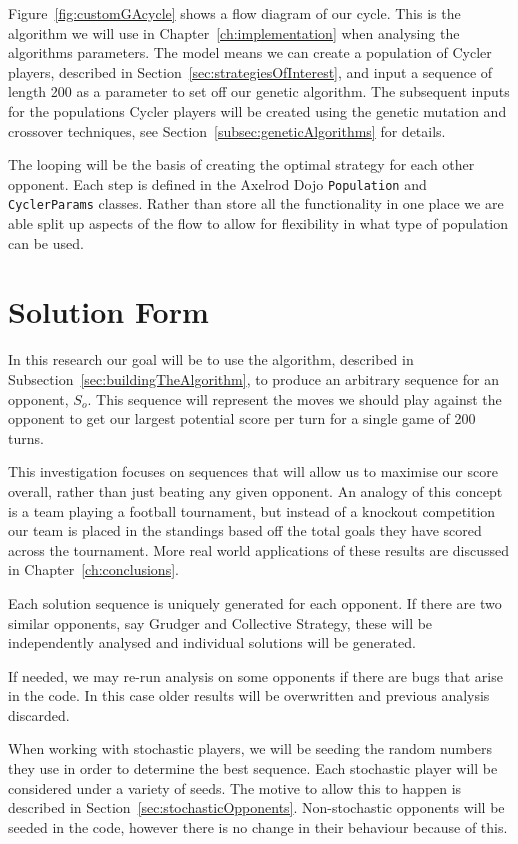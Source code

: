 Figure~\ref{fig:customGAcycle} shows a flow diagram of our cycle.
This is the algorithm we will use in Chapter~\ref{ch:implementation} when analysing the algorithms parameters.
The model means we can create a population of Cycler players, described in Section~\ref{sec:strategiesOfInterest}, and input a sequence of length 200 as a parameter to set off our genetic algorithm.
The subsequent inputs for the populations Cycler players will be created using the genetic mutation and crossover techniques, see Section~\ref{subsec:geneticAlgorithms} for details.

The looping will be the basis of creating the optimal strategy for each other opponent.
Each step is defined in the Axelrod Dojo \texttt{Population} and \texttt{CyclerParams} classes.
Rather than store all the functionality in one place we are able split up aspects of the flow to allow for flexibility in what type of population can be used.

\section{Solution Form}\label{sec:solutionForm}
In this research our goal will be to use the algorithm, described in Subsection~\ref{sec:buildingTheAlgorithm}, to produce an arbitrary sequence for an opponent, \(S_o\).
This sequence will represent the moves we should play against the opponent to get our largest potential score per turn for a single game of 200 turns.

This investigation focuses on sequences that will allow us to maximise our score overall, rather than just beating any given opponent.
An analogy of this concept is a team playing a football tournament, but instead of a knockout competition our team is placed in the standings based off the total goals they have scored across the tournament.
More real world applications of these results are discussed in Chapter~\ref{ch:conclusions}.

Each solution sequence is uniquely generated for each opponent.
If there are two similar opponents, say Grudger and Collective Strategy, these will be independently analysed and individual solutions will be generated.

If needed, we may re-run analysis on some opponents if there are bugs that arise in the code.
In this case older results will be overwritten and previous analysis discarded.

When working with stochastic players, we will be seeding the random numbers they use in order to determine the best sequence.
Each stochastic player will be considered under a variety of seeds.
The motive to allow this to happen is described in Section~\ref{sec:stochasticOpponents}. Non-stochastic opponents will be seeded in the code, however there is no change in their behaviour because of this.

